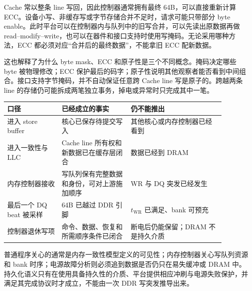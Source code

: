 
Cache 常以整条 line 写回，因此控制器通常拥有最终 64B，可以直接重新计算 ECC。设备小写、非缓存写或字节存储合并不足时，请求可能只带部分 byte enable。此时平台可以在控制器内与队列中的旧写合并，可以先读出原数据再做 read--modify--write，也可以在器件和接口支持时使用写掩码。无论采用哪种方法，ECC 都必须对应“合并后的最终数据”，不能拿旧 ECC 配新数据。

这也解释了为什么 byte mask、ECC 和原子性是三个不同概念。掩码决定哪些 byte 被物理修改；ECC 保护最后的码字；原子性说明其他观察者能否看到中间组合。接口支持字节掩码，并不自动保证任意跨 Cache line 写是原子的。跨越两条 line 的存储仍可能拆成两笔独立事务，掉电或异常时只完成其中一笔。


\begin{longtable}{L{0.22\linewidth}L{0.29\linewidth}L{0.38\linewidth}}
\toprule
口径 & 已经成立的事实 & 仍不能推出 \\
\midrule
进入 store buffer & 核心已保存待提交写入 & 其他核心或内存控制器已经看到 \\\tablerowrule
进入一致性与 LLC & Cache line 所有权和新数据已在缓存层闭合 & 数据已经到 DRAM \\\tablerowrule
内存控制器接收 & 写队列保有完整数据和身份，可对上游施加顺序 & WR 与 DQ 突发已经发生 \\\tablerowrule
最后一个 DQ beat 被采样 & 64B 已越过 DDR 引脚 & $t_{\mathrm{WR}}$ 已满足、bank 可预充 \\\tablerowrule
控制器退休写项 & 命令、数据、恢复和所需顺序条件已闭合 & 断电后仍能保留；DRAM 不是持久介质 \\
\bottomrule
\end{longtable}

普通程序关心的通常是内存一致性模型定义的可见性；内存控制器关心写队列资源和 bank 时序；电源故障分析则必须追到数据是否仍只在易失缓冲或 DRAM 中。持久化语义只有在使用具备持久性的介质、平台提供相应冲刷与电源失败保护，并满足其完成协议时才成立，不能由一次 DDR 写突发推导出来。


